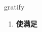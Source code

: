 
\begin{frame}
{\huge gratify}
\begin{center}
\begin{enumerate}\Large
  \item \textbf{使满足}
\end{enumerate}
\end{center}
\end{frame}
